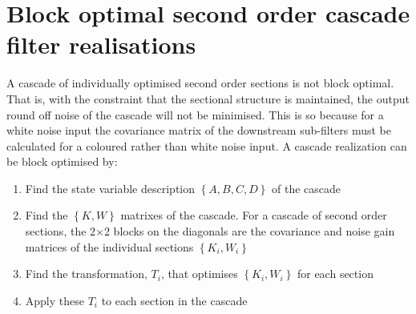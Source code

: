 \documentclass[a4paper,twoside,10pt,english]{report}
\begin{document}
\section{Block optimal second order cascade filter realisations}
A cascade of individually optimised second order sections
is not block optimal. That is, with the constraint that the sectional
structure is maintained, the output round off noise of the cascade
will not be minimised. This is so because for a white noise input
the covariance matrix of the downstream sub-filters must be calculated
for a coloured rather than white noise input. A cascade realization
can be block optimised by:
\begin{enumerate}
\item Find the state variable description $\left\{A,B,C,D\right\}$ of the cascade
\item Find the $\left\{K,W\right\}$ matrixes of the cascade. For
a cascade of second order sections, the 2$\times$2 blocks on the diagonals
are the covariance and noise gain matrices of the individual sections
$\left\{K_{i},W_{i}\right\}$
\item Find the transformation, $T_{i}$, that optimises 
$\left\{K_{i},W_{i}\right\}$ for each section
\item Apply these $T_{i}$ to each section in the cascade
\end{enumerate}
\end{document}
